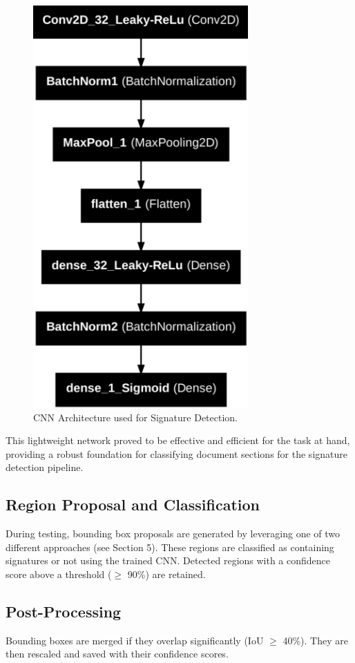 \documentclass[a4paper,12pt]{article}
\begin{document}
\begin{figure}[H]
    \centering
    \includegraphics[scale=0.7]{signmodel.png}
    \caption{CNN Architecture used for Signature Detection.}
    \label{fig:cnn_architecture}
\end{figure}

This lightweight network proved to be effective and efficient for the task at hand, providing a robust foundation for classifying document sections for the signature detection pipeline.

\subsection{Region Proposal and Classification}
During testing, bounding box proposals are generated by leveraging one of two different approaches (see Section 5). These regions are classified as containing signatures or not using the trained CNN. Detected regions with a confidence score above a threshold ($\ge$ 90\%) are retained.

\subsection{Post-Processing}
Bounding boxes are merged if they overlap significantly (IoU $\ge$ 40\%). They are then rescaled and saved with their confidence scores.
\end{document}
